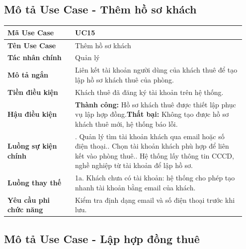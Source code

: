 \documentclass[a4paper,oneside]{report}
\begin{document}
\subsection{Mô tả Use Case - Thêm hồ sơ khách}

\begin{longtable}[]{@{}>{\RaggedRight\arraybackslash}p{0.27\linewidth}>{\RaggedRight\arraybackslash}p{0.68\linewidth}@{}}
\toprule
\textbf{Mã Use Case} & UC15\tabularnewline
\midrule
\endhead
\textbf{Tên Use Case} & Thêm hồ sơ khách\tabularnewline
\textbf{Tác nhân chính} & Quản lý\tabularnewline
\textbf{Mô tả ngắn} & Liên kết tài khoản người dùng của khách thuê để
tạo lập hồ sơ khách thuê của phòng.\tabularnewline
\textbf{Tiền điều kiện} & Khách thuê đã đăng ký tài khoản trên hệ
thống.\tabularnewline
\textbf{Hậu điều kiện} & \textbf{Thành công:} Hồ sơ khách thuê được thiết lập phục vụ lập hợp đồng.\newline \textbf{Thất bại:} Không tạo được hồ sơ khách thuê mới, hệ thống báo lỗi.\tabularnewline
\textbf{Luồng sự kiện chính} & 1. Quản lý tìm tài
khoản khách qua email hoặc số điện thoại.\newline 2. Chọn tài khoản
khách phù hợp để liên kết vào phòng thuê.\newline 3. Hệ thống lấy
thông tin CCCD, nghề nghiệp từ tài khoản để lập hồ sơ.\tabularnewline
\textbf{Luồng thay thế} & 1a. Khách chưa có tài khoản: hệ thống cho phép
tạo nhanh tài khoản bằng email của khách.\tabularnewline
\textbf{Yêu cầu phi chức năng} & Kiểm tra định dạng email và số điện
thoại trước khi lưu.\tabularnewline
\bottomrule
\end{longtable}

\subsection{Mô tả Use Case - Lập hợp đồng thuê}
\end{document}
